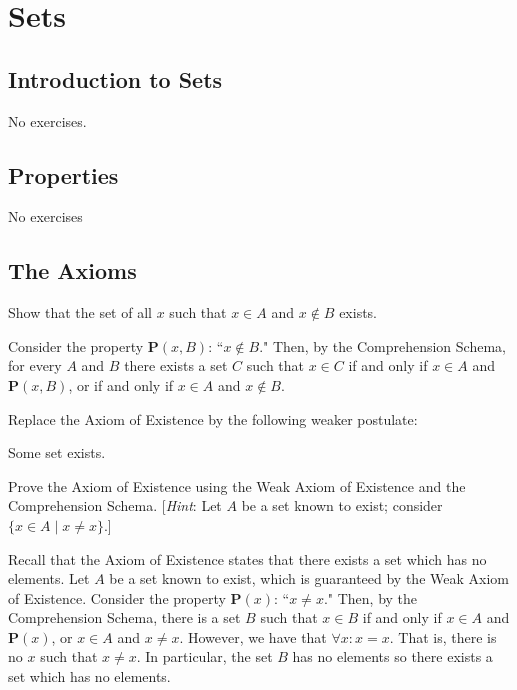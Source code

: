 \documentclass[class=report, crop=false]{standalone}
\begin{document}
  \chapter{Sets}

  \section{Introduction to Sets}

  No exercises.

  \section{Properties}

  No exercises

  \section{The Axioms}

  \begin{problem}
    Show that the set of all \(x\) such that \(x \in A\) and \(x \notin B\) exists.
  \end{problem}

  \begin{solution}
    Consider the property \(\textbf{P}(x, B)\): ``\(x \notin B\)." Then, by the Comprehension Schema, for every \(A\) and \(B\) there exists a set \(C\) such that \(x \in C\) if and only if \(x \in A\) and \(\textbf{P}(x, B)\), or if and only if \(x \in A\) and \(x \notin B\).
  \end{solution}


  \begin{problem}
    Replace the Axiom of Existence by the following weaker postulate:
    \begin{axiom}
      Some set exists.
    \end{axiom}
    Prove the Axiom of Existence using the Weak Axiom of Existence and the Comprehension Schema. [\textit{Hint}: Let \(A\) be a set known to exist; consider \(\{x \in A \mid x \neq x\}\).]
  \end{problem}

  \begin{solution}
    Recall that the Axiom of Existence states that there exists a set which has no elements. Let \(A\) be a set known to exist, which is guaranteed by the Weak Axiom of Existence. Consider the property \(\textbf{P}(x)\): ``\(x \neq x\)."
    Then, by the Comprehension Schema, there is a set \(B\) such that \(x \in B\) if and only if \(x \in A\) and \(\textbf{P}(x)\), or \(x \in A\) and \(x \neq x\). However, we have that \(\forall x : x = x\). That is, there is no \(x\) such that \(x \neq x\). In particular, the set \(B\) has no elements so there exists a set which has no elements.
  \end{solution}
\end{document}

